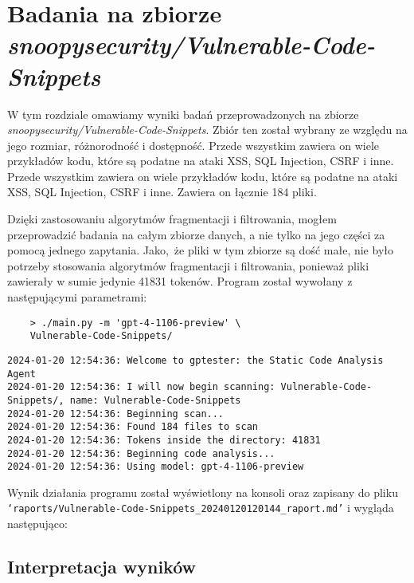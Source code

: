 

\section{Badania na zbiorze \textit{snoopysecurity/Vulnerable-Code-Snippets}}
\label{sec:badania_na_zbiorze_snoopysecurity}

W tym rozdziale omawiamy wyniki badań przeprowadzonych na zbiorze \textit{snoopysecurity/Vulnerable-Code-Snippets}. Zbiór ten został wybrany ze względu na jego rozmiar, różnorodność i dostępność. Przede wszystkim zawiera on wiele przykładów kodu, które są podatne na ataki XSS, SQL Injection, CSRF i inne.
Przede wszystkim zawiera on wiele przykładów kodu, które są podatne na ataki XSS, SQL Injection, CSRF i inne.
Zawiera on łącznie 184 pliki.

Dzięki zastosowaniu algorytmów fragmentacji i filtrowania, mogłem przeprowadzić badania na całym zbiorze danych, a nie tylko na jego części za pomocą jednego zapytania.
Jako, że pliki w tym zbiorze są dość małe, nie było potrzeby stosowania algorytmów fragmentacji i filtrowania, ponieważ pliki zawierały w sumie jedynie 41831 tokenów.
Program został wywołany z następującymi parametrami:
\begin{verbatim}
    > ./main.py -m 'gpt-4-1106-preview' \
    Vulnerable-Code-Snippets/
\end{verbatim}
\begin{verbatim}
2024-01-20 12:54:36: Welcome to gptester: the Static Code Analysis Agent
2024-01-20 12:54:36: I will now begin scanning: Vulnerable-Code-Snippets/, name: Vulnerable-Code-Snippets
2024-01-20 12:54:36: Beginning scan...
2024-01-20 12:54:36: Found 184 files to scan
2024-01-20 12:54:36: Tokens inside the directory: 41831
2024-01-20 12:54:36: Beginning code analysis...
2024-01-20 12:54:36: Using model: gpt-4-1106-preview
\end{verbatim}

Wynik działania programu został wyświetlony na konsoli oraz zapisany do pliku \texttt{`raports/Vulnerable-Code-Snippets_20240120120144_raport.md'} i wygląda następująco:


\subsection{Interpretacja wyników}
\label{subsec:interpretacja_wynikow}

